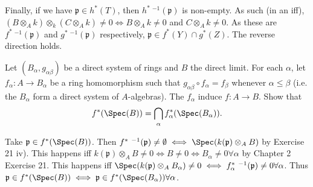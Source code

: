 \begin{questions}
\begin{solution}
	Finally, if we have $\mathfrak{p}\in h^\ast(T) $, then $h^\ast\ ^{-1}(\mathfrak{p}) $ is non-empty.
	As such (in an iff), $(B \otimes _A k) \otimes _k (C \otimes _A k) \ne 0 \iff B \otimes _A k \ne 0 $ and $C \otimes _A k \ne 0 $.
	As these are $f^\ast\ ^{-1}(\mathfrak{p}) $ and $g^\ast\ ^{-1}(\mathfrak{p})$ respectively, $\mathfrak{p} \in f^\ast(Y) \cap g^\ast(Z) $.
	The reverse direction holds.
\end{solution}

\question Let $(B_{\alpha }, g_{\alpha \beta}) $ be a direct system of rings and $B $ the direct limit. For each $\alpha $, let $f_{\alpha}: A\to B_{\alpha} $ be a ring homomorphism such that $g_{\alpha \beta} \circ f_{\alpha} = f_{\beta}$ whenever $\alpha\le \beta $ (i.e. the $B_{\alpha} $ form a direct system of $A $-algebras). The $f_{\alpha} $ induce $f:A\to B $. Show that
\[
	f^\ast(\Spec(B)) = \bigcap_{\alpha} f^\ast_ \alpha (\Spec(B_ \alpha))
.\] 
\begin{solution}
	Take $\mathfrak{p} \in f^\ast(\Spec(B)) $.
	Then $f^\ast\ ^{-1}(\mathfrak{p}) \ne \emptyset \iff \Spec(k(\mathfrak{p}) \otimes _A B)$ by Exercise 21 iv).
	This happens iff $k(\mathfrak{p}) \otimes _A B \ne 0 \iff B \ne 0 \iff B_ \alpha \ne 0 \forall \alpha$ by Chapter 2 Exercise 21.
	This happens iff $\Spec(k(\mathfrak{p}) \otimes _A B_ \alpha) \ne 0 \iff f_ \alpha^\ast\ ^{-1}(\mathfrak{p}) \ne 0 \forall \alpha $.
	Thus $\mathfrak{p} \in f^\ast(\Spec(B)) \iff \mathfrak{p} \in f^\ast(\Spec(B_ \alpha)) \forall \alpha$.
\end{solution}


\end{questions}
